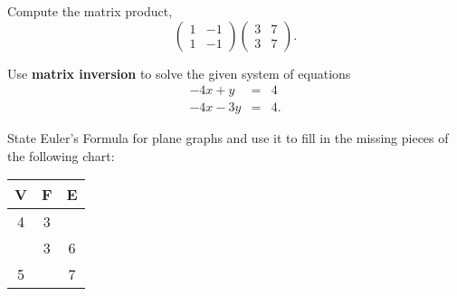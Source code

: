 \documentclass[12pt]{amsart}
\begin{document}
\newpage

\begin{thm}[20 Points]\label{ex4}
  Compute the matrix product,
  $$\left(\begin{array}{cc}
    1 & -1\\
    1 & -1
  \end{array}\right) 
  \left(\begin{array}{cc}
    3 & 7\\
    3 & 7
  \end{array}\right).$$
  \vspace{2in}
\end{thm}

\begin{thm}[20 Points]
  Use {\bf matrix inversion} to solve the given system of equations
  \begin{eqnarray*}
    -4x + y &=& 4\\
    -4x - 3y &=& 4.
  \end{eqnarray*}
  
\end{thm}
\newpage

\begin{thm}\label{bonus}
  State Euler's Formula for plane graphs and use it to fill in the missing pieces of the following chart:
  
  \renewcommand{\arraystretch}{1.5}
  \begin{center}
    \begin{tabular}{|c|c|c|}
      \hline
      V & F & E\\
      \hline
      4 & 3 & \\
      \hline
      & 3 & 6 \\
      \hline
      5 & & 7 \\
      \hline
    \end{tabular}
  \end{center}
\end{thm}
\newpage
\end{document}
